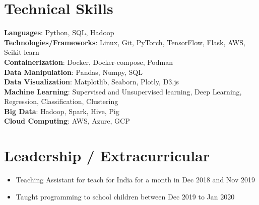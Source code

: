 \documentclass[letterpaper,10pt]{article}
\newcommand{\resumeItem}[1]{
  \item\small{
    {#1 \vspace{-2pt}}
  }
}
\newcommand{\resumeItemListStart}{\begin{itemize}}
\newcommand{\resumeItemListEnd}{\end{itemize}\vspace{-5pt}}
\begin{document}
%
\section{Technical Skills}
 \begin{itemize}
    \small{\item{
    \textbf{Languages}{: Python, SQL, Hadoop} \\
\textbf{Technologies/Frameworks}{: Linux, Git, PyTorch, TensorFlow, Flask, AWS, Scikit-learn} \\
\textbf{Containerization}{: Docker, Docker-compose, Podman} \\
\textbf{Data Manipulation}{: Pandas, Numpy, SQL} \\
\textbf{Data Visualization}{: Matplotlib, Seaborn, Plotly, D3.js} \\
\textbf{Machine Learning}{: Supervised and Unsupervised learning, Deep Learning, Regression, Classification, Clustering} \\
\textbf{Big Data}{: Hadoop, Spark, Hive, Pig} \\
\textbf{Cloud Computing}{: AWS, Azure, GCP} \\
    }}
 \end{itemize}
 \vspace{-16pt}


\section{Leadership / Extracurricular}
            \resumeItemListStart
                \resumeItem{Teaching Assistant for teach for India for a month in Dec 2018 and Nov 2019}
                \resumeItem{Taught programming to school children between Dec 2019 to Jan 2020}
            \resumeItemListEnd
\end{document}

